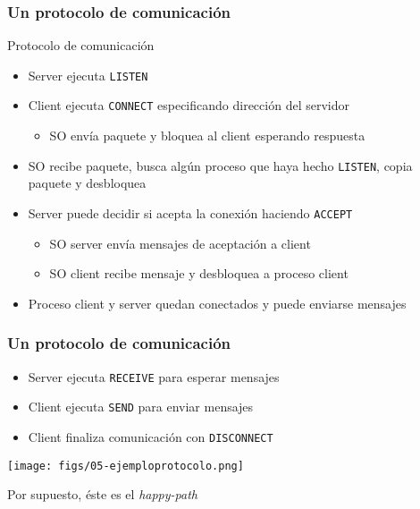 \documentclass[letter]{beamer}
\begin{document}
\begin{frame}
  \frametitle{Un protocolo de comunicación}

  Protocolo de comunicación
  \begin{itemize}
    \item Server ejecuta {\tt LISTEN}
    \item Client ejecuta {\tt CONNECT} especificando dirección del servidor
      \begin{itemize}
        \item SO envía paquete y bloquea al client esperando respuesta
      \end{itemize}
    \item SO recibe paquete, busca algún proceso que haya hecho {\tt LISTEN}, copia paquete y desbloquea
    \item Server puede decidir si acepta la conexión haciendo {\tt ACCEPT}
      \begin{itemize}
        \item SO server envía mensajes de aceptación a client
        \item SO client recibe mensaje y desbloquea a proceso client
      \end{itemize}
    \item Proceso client y server quedan conectados y puede enviarse mensajes
  \end{itemize}
\end{frame}

\begin{frame}
  \frametitle{Un protocolo de comunicación}

  \begin{itemize}
    \item Server ejecuta {\tt RECEIVE} para esperar mensajes
    \item Client ejecuta {\tt SEND} para enviar mensajes
    \item Client finaliza comunicación con {\tt DISCONNECT}
  \end{itemize}
  
  \begin{center}
    \texttt{[image: figs/05-ejemploprotocolo.png]}
  \end{center}

  Por supuesto, éste es el {\em happy-path}

\end{frame}
\end{document}
